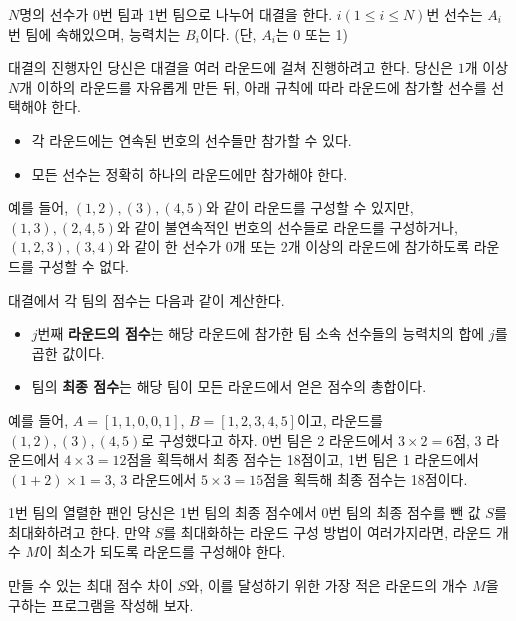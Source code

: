 $N$명의 선수가 0번 팀과 1번 팀으로 나누어 대결을 한다. $i(1 \le i \le N)$번 선수는 $A_i$번 팀에 속해있으며, 능력치는 $B_i$이다. (단, $A_i$는 0 또는 1)

대결의 진행자인 당신은 대결을 여러 라운드에 걸쳐 진행하려고 한다. 당신은 $1$개 이상 $N$개 이하의 라운드를 자유롭게 만든 뒤, 아래 규칙에 따라 라운드에 참가할 선수를 선택해야 한다.

\begin{itemize}
    \item 각 라운드에는 연속된 번호의 선수들만 참가할 수 있다.
    \item 모든 선수는 정확히 하나의 라운드에만 참가해야 한다.
\end{itemize}

예를 들어, $(1, 2), (3), (4, 5)$와 같이 라운드를 구성할 수 있지만, $(1, 3), (2, 4, 5)$와 같이 불연속적인 번호의 선수들로 라운드를 구성하거나, $(1, 2, 3), (3, 4)$와 같이 한 선수가 0개 또는 2개 이상의 라운드에 참가하도록 라운드를 구성할 수 없다.

대결에서 각 팀의 점수는 다음과 같이 계산한다.

\begin{itemize}
    \item $j$번째 \textbf{라운드의 점수}는 해당 라운드에 참가한 팀 소속 선수들의 능력치의 합에 $j$를 곱한 값이다.
    \item 팀의 \textbf{최종 점수}는 해당 팀이 모든 라운드에서 얻은 점수의 총합이다.
\end{itemize}

예를 들어, $A = [1, 1, 0, 0, 1]$, $B = [1, 2, 3, 4, 5]$이고, 라운드를 $(1, 2), (3), (4, 5)$로 구성했다고 하자. 0번 팀은 2 라운드에서 $3 \times 2 = 6$점, 3 라운드에서 $4 \times 3 = 12$점을 획득해서 최종 점수는 18점이고, 1번 팀은 1 라운드에서 $(1+2) \times 1 = 3$, 3 라운드에서 $5 \times 3 = 15$점을 획득해 최종 점수는 18점이다.

1번 팀의 열렬한 팬인 당신은 1번 팀의 최종 점수에서 0번 팀의 최종 점수를 뺀 값 $S$를 최대화하려고 한다. 만약 $S$를 최대화하는 라운드 구성 방법이 여러가지라면, 라운드 개수 $M$이 최소가 되도록 라운드를 구성해야 한다.

만들 수 있는 최대 점수 차이 $S$와, 이를 달성하기 위한 가장 적은 라운드의 개수 $M$을 구하는 프로그램을 작성해 보자.